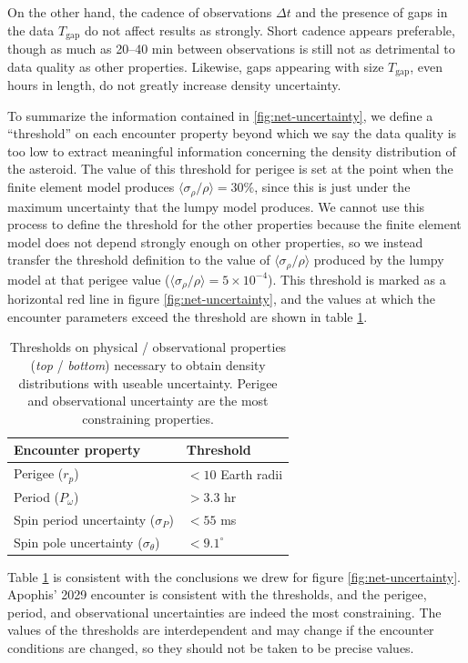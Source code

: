 \documentclass[fleqn,usenatbib]{mnras}
\begin{document}
On the other hand, the cadence of observations $\Delta t$ and the presence of gaps in the data $T_\text{gap}$ do not affect results as strongly. Short cadence appears preferable, though as much as 20--40 min between observations is still not as detrimental to data quality as other properties. Likewise, gaps appearing with size $T_\text{gap}$, even hours in length, do not greatly increase density uncertainty. 

To summarize the information contained in \ref{fig:net-uncertainty}, we define a ``threshold'' on each encounter property beyond which we say the data quality is too low to extract meaningful information concerning the density distribution of the asteroid. The value of this threshold for perigee is set at the point when the finite element model produces $\langle \sigma_\rho / \rho \rangle = 30\%$, since this is just under the maximum uncertainty that the lumpy model produces. We cannot use this process to define the threshold for the other properties because the finite element model does not depend strongly enough on other properties, so we instead transfer the threshold definition to the value of $\langle \sigma_\rho / \rho \rangle$ produced by the lumpy model at that perigee value ($\langle \sigma_\rho / \rho \rangle = 5\times 10^{-4}$). This threshold is marked as a horizontal red line in figure \ref{fig:net-uncertainty}, and the values at which the encounter parameters exceed the threshold are shown in table \ref{tab:threshold-summary}.

\begin{table}
  \centering
  \begin{tabular}{ll} \hline
    Encounter property & Threshold \\ \hline
    Perigee ($r_p$) & $<10$ Earth radii\\
    Period ($P_\omega$) & $>3.3$ hr \\ \hline
    Spin period uncertainty ($\sigma_P$) & $<55$ ms\\
    Spin pole uncertainty ($\sigma_\theta$) & $< 9.1^\circ$ \\
    \hline
  \end{tabular}
  \caption{Thresholds on physical / observational properties (\textit{top} / \textit{bottom}) necessary to obtain density distributions with useable uncertainty. Perigee and observational uncertainty are the most constraining properties.}
  \label{tab:threshold-summary}
\end{table}

Table \ref{tab:threshold-summary} is consistent with the conclusions we drew for figure \ref{fig:net-uncertainty}. Apophis' 2029 encounter is consistent with the thresholds, and the perigee, period, and observational uncertainties are indeed the most constraining. The values of the thresholds are interdependent and may change if the encounter conditions are changed, so they should not be taken to be precise values.
\end{document}
